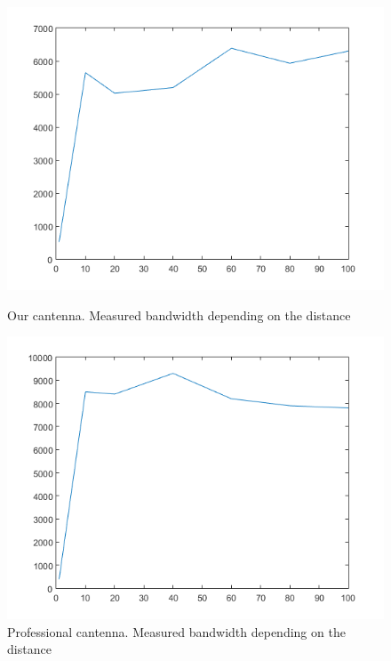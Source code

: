 \documentclass[12pt,a4paper]{article}
\newcommand{\figurewidth}[0]{.65\textwidth}
\begin{document}
\begin{figure}\begin{center}
	\includegraphics[width=\figurewidth]{plots/can_b.png}
	\caption{Our cantenna. Measured bandwidth depending on the distance}
	\label{img:dist:band:can}

	\includegraphics[width=\figurewidth]{plots/prof_b.png}
	\caption{Professional cantenna. Measured bandwidth depending on the distance}
	\label{img:dist:band:prof}



\end{center}
\end{figure}
\end{document}
